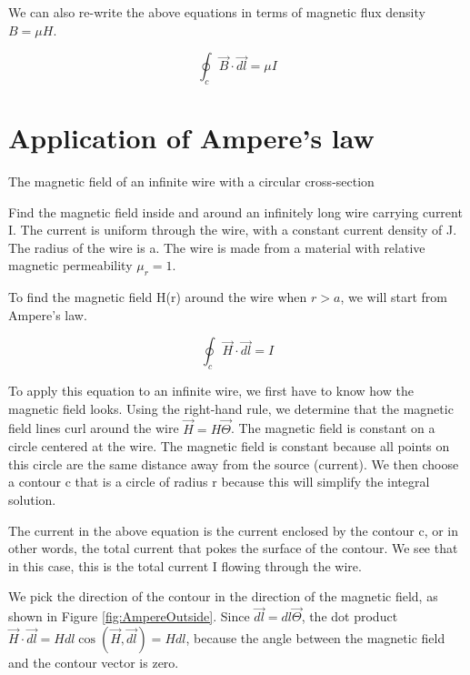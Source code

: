 \documentclass{ximera}
\begin{document}
We can also re-write the above equations in terms of magnetic flux density $B=\mu H$.


\begin{equation}
\oint_c \vec{B} \cdot \vec{dl} = \mu I
\end{equation}

\section{Application of Ampere's law}

\begin{example}
The magnetic field of an infinite wire with a circular cross-section

Find the magnetic field inside and around an infinitely long wire carrying current I. The current is uniform through the wire, with a constant current density of J. The radius of the wire is a. The wire is made from a material with relative magnetic permeability $\mu_r=1$. 
 
\begin{explanation}


To find the magnetic field H(r) around the wire when $r>a$, we will start from Ampere's law.


\begin{equation}
\oint_c \vec{H} \cdot \vec{dl} = I
\end{equation}

To apply this equation to an infinite wire, we first have to know how the magnetic field looks. Using the right-hand rule, we determine that the magnetic field lines curl around the wire $\vec{H}=H \vec{\Theta}$. The magnetic field is constant on a circle centered at the wire. The magnetic field is constant because all points on this circle are the same distance away from the source (current). We then choose a contour c that is a circle of radius r because this will simplify the integral solution. 

The current in the above equation is the current enclosed by the contour c, or in other words, the total current that pokes the surface of the contour. We see that in this case, this is the total current I flowing through the wire.

We pick the direction of the contour in the direction of the magnetic field, as shown in Figure \ref{fig:AmpereOutside}. Since $\vec{dl}=dl \vec{\Theta}$, the dot product $ \vec{H} \cdot \vec{dl} = H dl \cos(\vec{H},\vec{dl})=H dl$, because the  angle between the magnetic field and the contour vector is zero.


\end{explanation}
\end{example}
\end{document}
